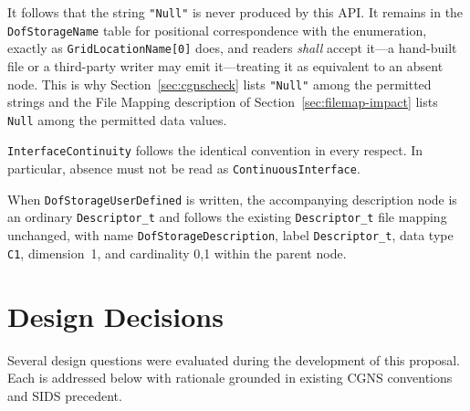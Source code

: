 \documentclass[11pt,letterpaper]{article}
\begin{document}
It follows that the string \texttt{"Null"} is never produced by this API.
It remains in the \texttt{DofStorageName} table for positional
correspondence with the enumeration, exactly as
\texttt{GridLocationName[0]} does, and readers \emph{shall} accept
it---a hand-built file or a third-party writer may emit it---treating it
as equivalent to an absent node.  This is why
Section~\ref{sec:cgnscheck} lists \texttt{"Null"} among the permitted
strings and the File Mapping description of
Section~\ref{sec:filemap-impact} lists \texttt{Null} among the permitted
data values.

\texttt{InterfaceContinuity} follows the identical convention in every
respect.  In particular, absence must not be read as
\texttt{ContinuousInterface}.

When \texttt{DofStorageUserDefined} is written, the accompanying
description node is an ordinary \texttt{Descriptor\_t} and follows
the existing \texttt{Descriptor\_t} file mapping unchanged, with
name \texttt{DofStorageDescription}, label
\texttt{Descriptor\_t}, data type \texttt{C1}, dimension~1, and
cardinality 0,1 within the parent node.

\section{Design Decisions}

Several design questions were evaluated during the development
of this proposal.  Each is addressed below with rationale grounded in
existing CGNS conventions and SIDS precedent.
\end{document}
